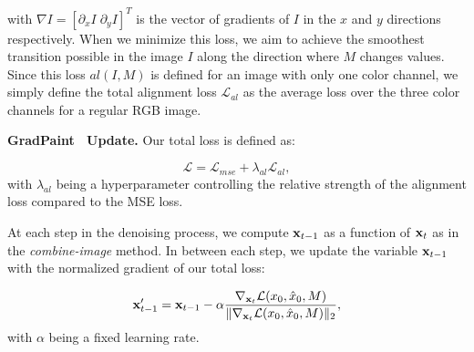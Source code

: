 


\noindent with $\nabla I = [\partial_x I \; \partial_y I]^T$ is the vector of gradients of $I$ in the $x$ and $y$ directions respectively. 
When we minimize this loss, we aim to achieve the smoothest transition possible in the image $I$ along the direction where $M$ changes values. 
Since this loss $al(I, M)$  is defined for an image with only one color channel, we simply define the total alignment loss $\mathcal{L}_{al}$ as the average loss over the three color channels for a regular RGB image.


\noindent \textbf{GradPaint ~Update.} Our total loss is defined as:

\begin{equation}
\mathcal{L} = \mathcal{L}_{mse} + \lambda_{al} \mathcal{L}_{al},
\end{equation}
with $\lambda_{al}$ being a hyperparameter controlling the relative strength of the alignment loss compared to the MSE loss.





At each step in the denoising process, we compute $\mathbf{x}_{t-1}$ as a function of $\mathbf{x}_t$ as in the \textit{combine-image} method. In between each step, we update the variable $\mathbf{x}_{t-1}$ with the normalized gradient of our total loss:

\begin{equation}
\mathbf{x}_{t-1}' = \mathbf{x}_{t-1} - \alpha \frac{\nabla_{\mathbf{x}_t}\mathcal{L}(x_0, \hat{x}_0, M)}{\Vert \nabla_{\mathbf{x}_t}\mathcal{L}(x_0, \hat{x}_0, M) \Vert_2},
\end{equation}
with $\alpha$ being a fixed learning rate.



